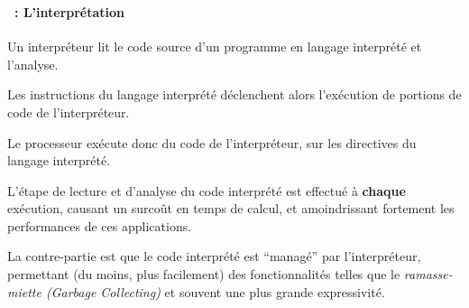 \begin{frame}
  \frametitle{\secname}
  \framesubtitle{\subsecname~: L'interprétation}
  \par
  Un interpréteur lit le code source d'un programme en langage interprété et l'analyse.
  \par
  Les instructions du langage interprété déclenchent alors l'exécution de portions de code de l'interpréteur. 
  \par
  Le processeur exécute donc du code de l'interpréteur, sur les directives du langage interprété.
  \par
  L'étape de lecture et d'analyse du code interprété est effectué à \textbf{chaque} exécution, causant un surcoût en temps de calcul, 
  et amoindrissant fortement les performances de ces applications.
  \par
  La contre-partie est que le code interprété est ``managé'' par l'interpréteur, permettant (du moins, plus facilement) des
  fonctionnalités telles que le \emph{ramasse-miette (Garbage Collecting)} et souvent une plus grande expressivité.
\end{frame}

